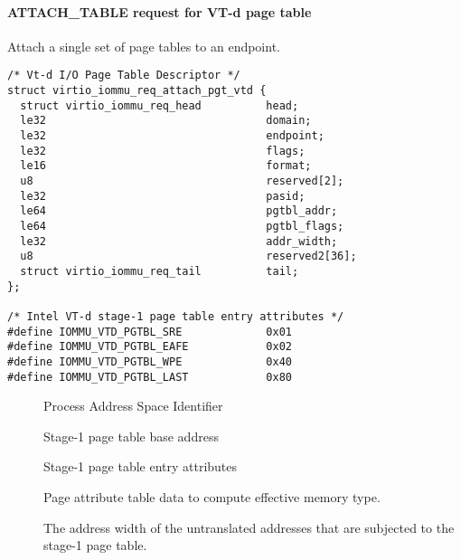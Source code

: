 \paragraph{ATTACH_TABLE request for VT-d page table}\label{sec:Device Types / IOMMU Device / Table Formats / VT-d / ATTACH_TABLE}

Attach a single set of page tables to an endpoint.

\begin{lstlisting}
/* Vt-d I/O Page Table Descriptor */
struct virtio_iommu_req_attach_pgt_vtd {
  struct virtio_iommu_req_head          head;
  le32                                  domain;
  le32                                  endpoint;
  le32                                  flags;
  le16                                  format;
  u8                                    reserved[2];
  le32                                  pasid;
  le64                                  pgtbl_addr;
  le64                                  pgtbl_flags;
  le32                                  addr_width;
  u8                                    reserved2[36];
  struct virtio_iommu_req_tail          tail;
};

/* Intel VT-d stage-1 page table entry attributes */
#define	IOMMU_VTD_PGTBL_SRE             0x01
#define	IOMMU_VTD_PGTBL_EAFE            0x02
#define	IOMMU_VTD_PGTBL_WPE             0x40
#define	IOMMU_VTD_PGTBL_LAST            0x80
\end{lstlisting}

\begin{description}
  \item[] Process Address Space Identifier
  \item[] Stage-1 page table base address
  \item[] Stage-1 page table entry attributes
  \item[] Page attribute table data to compute
    effective memory type.
  \item[] The address width of the untranslated
    addresses that are subjected to the stage-1 page table.
\end{description}
